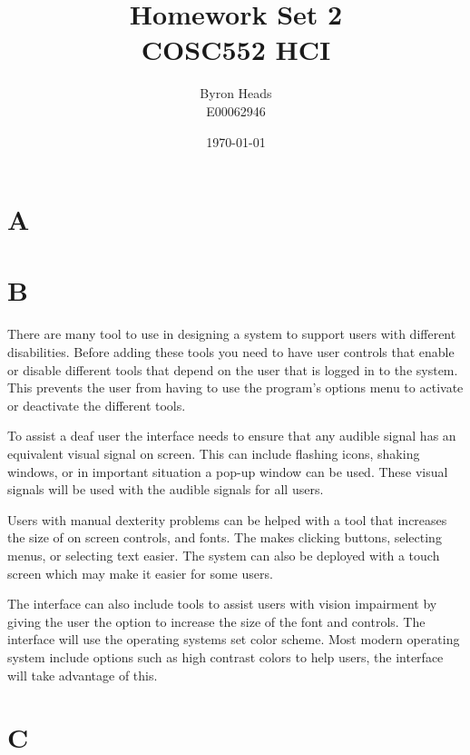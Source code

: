 \documentclass[12pt]{article}
\title{Homework Set 2 \\
    COSC552 HCI}
\author{ Byron Heads \\
    E00062946 }
\date{\today}
\begin{document}
\maketitle

\section*{A}

\section*{B}

There are many tool to use in designing a system to support users with 
different disabilities.  Before adding these tools you need to have user
controls that enable or disable different tools that depend on the user
that is logged in to the system.  This prevents the user from having to
use the program's options menu to activate or deactivate the different
tools.

To assist a deaf user the interface needs to ensure that any audible signal
has an equivalent visual signal on screen.  This can include flashing 
icons, shaking windows, or in important situation a pop-up window can
be used.  These visual signals will be used with the audible signals for
all users.

Users with manual dexterity problems can be helped with a tool that
increases the size of on screen controls, and fonts.  The makes clicking
buttons, selecting menus, or selecting text easier.  The system can also
be deployed with a touch screen which may make it easier for some users.

The interface can also include tools to assist users with vision 
impairment by giving the user the option to increase the size of the font
and controls.  The interface will use the operating systems set color
scheme.  Most modern operating system include options such as high contrast
colors to help users, the interface will take advantage of this.

\section*{C}
\end{document}
